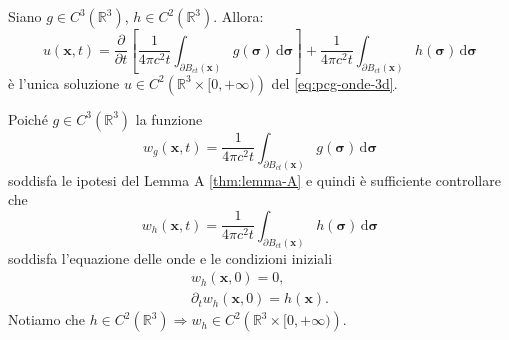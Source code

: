 \documentclass[10pt,a4paper,twoside,openright]{book}
\newcommand{\x}{\mathbf{x}}
\newcommand{\sigg}{\bm{\sigma}}
\newcommand{\de}{\,\mathrm d}
\newcommand{\dsig}{\de \sigg}
\begin{document}
\begin{theorem}
     Siano $\displaystyle g\in C^{3}\left(\mathbb{R}^{3}\right)$, $\displaystyle h\in C^{2}\left(\mathbb{R}^{3}\right)$. Allora:
    \begin{equation}
        u(\x ,t) =\frac{\partial }{\partial t}\left[\frac{1}{4\pi c^{2} t}\int _{\partial B_{ct}(\x)} g(\sigg) \dsig\right] +\frac{1}{4\pi c^{2} t}\int _{\partial B_{ct}(\x)} h(\sigg) \dsig
    \end{equation}
    è l'unica soluzione $\displaystyle u\in C^{2}\left(\mathbb{R}^{3} \times [ 0,+\infty)\right)$ del \eqref{eq:pcg-onde-3d}.
\end{theorem}
\begin{dimostrazione}
    Poiché $\displaystyle g\in C^{3}\left(\mathbb{R}^{3}\right)$ la funzione
    \begin{equation*}
        w_{g}(\x ,t) =\frac{1}{4\pi c^{2} t}\int _{\partial B_{ct}(\x)} g(\sigg) \dsig
    \end{equation*}
    soddisfa le ipotesi del Lemma A \ref{thm:lemma-A} e quindi è sufficiente controllare che
    \begin{equation*}
        w_{h}(\x ,t) =\frac{1}{4\pi c^{2} t}\int _{\partial B_{ct}(\x)} h(\sigg) \dsig
    \end{equation*}
    soddisfa l'equazione delle onde e le condizioni iniziali
    \begin{gather*}
        w_{h}(\x ,0) =0,\\
        \partial _{t} w_{h}(\x ,0) =h(\x) .
    \end{gather*}
    Notiamo che $\displaystyle h\in C^{2}\left(\mathbb{R}^{3}\right) \Rightarrow w_{h} \in C^{2}\left(\mathbb{R}^{3} \times [ 0,+\infty)\right)$.


\end{dimostrazione}
\end{document}
